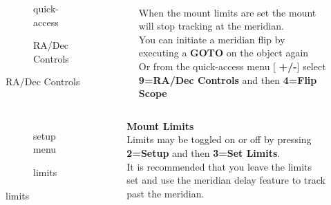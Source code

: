 \begin{frame}[t]{\insertsubsectionhead}
    \begin{columns}[T]
      \begin{figure}[ht]
          \begin{subfigure}{0.67\textwidth}
          \caption{quick-access}
        \end{subfigure}
        \vspace{\fill}
        \begin{subfigure}{0.67\textwidth}
          \caption{RA/Dec Controls}
        \end{subfigure}
      \end{figure}
    \ \\[0.25ex]
    When the mount limits are set the mount will stop tracking at the
    meridian. \\[1ex]

    You can initiate a meridian flip by executing a \textbf{GOTO} on the object
    again \\[1ex]

    Or from the quick-access menu [ \textbf{+/-}] select \textbf{9=RA/Dec Controls}
    and then \textbf{4=Flip Scope}

  \end{columns}
\end{frame}


\begin{frame}[t]{\insertsubsectionhead}
    \begin{columns}[T]
      \begin{figure}[ht]
          \begin{subfigure}{0.67\textwidth}
          \caption{setup menu}
        \end{subfigure}
        \vspace{\fill}
        \begin{subfigure}{0.67\textwidth}
          \caption{limits}
        \end{subfigure}
      \end{figure}
    \textbf{Mount Limits} \\[0.25ex]

    Limits may be toggled on or off by pressing \textbf{2=Setup} and
    then \textbf{3=Set Limits}. \\[1ex]

    It is recommended that you leave the limits set and use the meridian delay
    feature to track past the meridian. 
  \end{columns}
\end{frame}

